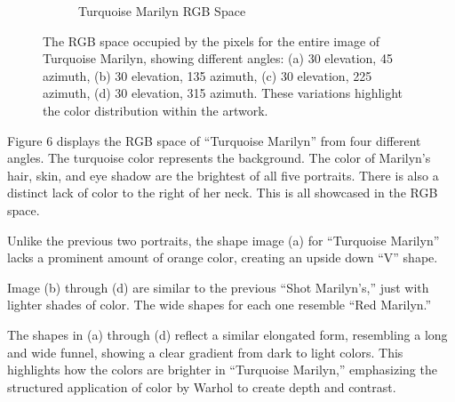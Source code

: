 \documentclass{article}
\begin{document}
\begin{figure}[ht]
\begin{subfigure}{0.45\textwidth}
    \caption{Turquoise Marilyn RGB Space}
    \label{fig:4_12_turq_marilyn_original_scatter}
  \end{subfigure}
  \caption{The RGB space occupied by the pixels for the entire image of Turquoise Marilyn, showing different angles: (a) 30 \degree elevation, 45 \degree azimuth, (b) 30 \degree elevation, 135 \degree azimuth, (c) 30 \degree elevation, 225 \degree azimuth, (d) 30 \degree elevation, 315 \degree azimuth. These variations highlight the color distribution within the artwork.}
  \label{fig:turq_marilyn_original_scatter_2}
\end{figure}

Figure 6 displays the RGB space of ``Turquoise Marilyn'' from four
different angles. The turquoise color represents the background. The
color of Marilyn's hair, skin, and eye shadow are the brightest of all
five portraits. There is also a distinct lack of color to the right of
her neck. This is all showcased in the RGB space.

Unlike the previous two portraits, the shape image (a) for ``Turquoise
Marilyn'' lacks a prominent amount of orange color, creating an upside
down ``V'' shape.

Image (b) through (d) are similar to the previous ``Shot Marilyn's,''
just with lighter shades of color. The wide shapes for each one resemble
``Red Marilyn.''

The shapes in (a) through (d) reflect a similar elongated form,
resembling a long and wide funnel, showing a clear gradient from dark to
light colors. This highlights how the colors are brighter in ``Turquoise
Marilyn,'' emphasizing the structured application of color by Warhol to
create depth and contrast.
\end{document}
